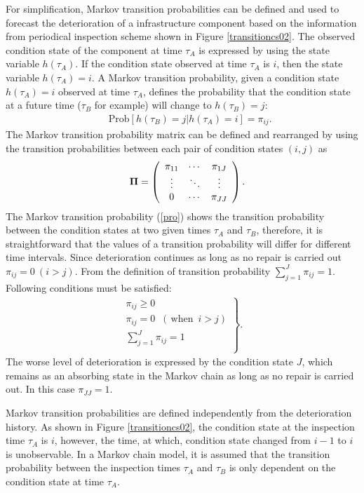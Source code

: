 For simplification, Markov transition probabilities can be defined and used to forecast the deterioration of a infrastructure component based on the information from periodical inspection scheme shown in Figure \ref{transitioncs02}. The observed condition state of the component at time $\tau_A$ is expressed by using the state variable $h(\tau_A) $. If the condition state observed at time $\tau_A$ is $i$, then the state variable $h(\tau_A)=i$. A Markov transition probability, given a condition state $h(\tau_A) =i$ observed at time $\tau_A$, defines the probability that the condition state at a future time ($\tau_B$ for example) will change to $h(\tau_B) =j$:
\begin{eqnarray}
&& \mbox{Prob}[h(\tau_B)=j|h(\tau_A)=i]=\pi_{ij}.\label{pro}
\end{eqnarray}
The Markov transition probability matrix can be defined and rearranged by using the transition probabilities between each pair of condition states $(i,j)$ as
\begin{eqnarray}
&& {\bf \Pi}=\left(
\begin{array}{ccc}
\pi_{11} & \cdots & \pi_{1J} \\
\vdots & \ddots & \vdots \\
0 & \cdots & \pi_{JJ}
\end{array}
\right). 
\end{eqnarray}
The Markov transition probability (\ref{pro}) shows the transition probability between the condition states at two given times $\tau_A$ and $\tau_B$, therefore, it is straightforward that the values of a transition probability will differ for different time intervals. Since deterioration continues as long as no repair is carried out $\pi_{ij}=0~(i>j)$. From the definition of transition probability $\sum^{J}_{j=1}\pi_{ij}=1$. Following conditions must be satisfied:
\begin{eqnarray}
\left.
\begin{array}{l}
\pi_{ij}\geq 0 \\
\pi_{ij}=0 \,\,~(\,\mbox{when} \,\,\, i>j) \\
\sum_{j=1}^J \pi_{ij}=1 \\
\end{array}
\right\}.\label{suii}
\end{eqnarray}
The worse level of deterioration is expressed by the condition state $J$, which remains as an absorbing state in the Markov chain as long as no repair is carried out. In this case $\pi_{JJ}=1$.

Markov transition probabilities are defined independently from the deterioration history. As shown in Figure \ref{transitioncs02}, the condition state at the inspection time $\tau_A$ is $i$, however, the time, at which, condition state changed from $i-1$ to $i$ is unobservable. In a Markov chain model, it is assumed that the transition probability between the inspection times $\tau_A$ and $\tau_B$ is only dependent on the condition state at time $\tau_A$. 

